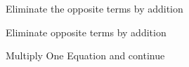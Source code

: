 \documentclass[12pt, a4paper, addpoints]{exam}
\newcommand{\elimination}[6]{%
    \pgfmathsetmacro{\cval}{#3*#1 + #5*#2} %
    \pgfmathsetmacro{\pval}{#4*#1 + #6*#2} %

    \def\formata{%
        \ifnum#3=1
            x
        \else\ifnum#3=-1
            -x
        \else
            \pgfmathprintnumber{#3}x
        \fi\fi}

    \def\formatb{%
        \ifnum#5=1
            +y
        \else\ifnum#5=-1
            -y
        \else
            \ifnum#5<0 \pgfmathprintnumber{#5}y \else +\pgfmathprintnumber{#5}y \fi
        \fi\fi}

    \def\formatd{%
        \ifnum#4=1
            x
        \else\ifnum#4=-1
            -x
        \else
            \pgfmathprintnumber{#4}x
        \fi\fi}

    \def\formate{%
        \ifnum#6=1
            +y
        \else\ifnum#6=-1
            -y
        \else
            \ifnum#6<0 \pgfmathprintnumber{#6}y \else +\pgfmathprintnumber{#6}y \fi
        \fi\fi}

    \[
    \begin{aligned}
    \formata \formatb &= \pgfmathprintnumber{\cval} \\[-1pt]
    \formatd \formate &= \pgfmathprintnumber{\pval}
    \end{aligned}
    \]
}
\begin{document}
\large
\begin{questions}

\question Eliminate the opposite terms by addition
\begin{multicols}{2} %
\end{multicols}

\question Eliminate opposite terms by addition
\begin{multicols}{2} %
\end{multicols}
\newpage
\renewcommand{\verticalspace}{\vspace{35mm}} 
\question Multiply One Equation and continue
\begin{multicols}{2} %
\begin{parts}


\end{parts}
\end{multicols}
\end{questions}
\end{document}
